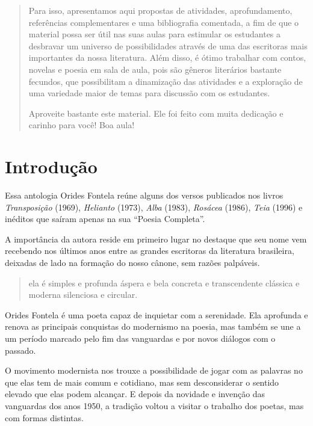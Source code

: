 \documentclass[12pt]{extarticle}
\begin{document}
\begin{abstract}


Para isso, apresentamos aqui propostas de atividades, aprofundamento,
referências complementares e uma bibliografia comentada, a fim de que o
material possa ser útil nas suas aulas para estimular os estudantes a
desbravar um universo de possibilidades através de uma das escritoras
mais importantes da nossa literatura. Além disso, é ótimo trabalhar com
contos, novelas e poesia em sala de aula, pois são gêneros literários
bastante fecundos, que possibilitam a dinamização das atividades e a
exploração de uma variedade maior de temas para discussão com os
estudantes.

Aproveite bastante este material. Ele foi feito com muita dedicação e
carinho para você! Boa aula!
\end{abstract}

\tableofcontents

\section{Introdução} 

Essa antologia Orides Fontela reúne alguns dos versos publicados nos livros
\textit{Transposição} (1969), \textit{Helianto} (1973), \textit{Alba} (1983),
\textit{Rosácea} (1986), \textit{Teia} (1996) e inéditos que saíram apenas na
sua “Poesia Completa”.

A importância da autora reside em primeiro lugar no destaque que seu nome vem
recebendo nos últimos anos entre as grandes escritoras da literatura
brasileira, deixadas de lado na formação do nosso cânone, sem razões palpáveis.

\begin{verse}
ela é simples e profunda
áspera e bela 
concreta e transcendente
clássica e moderna
silenciosa e circular.
\end{verse}

Orides Fontela é uma poeta capaz de inquietar com a serenidade.
Ela aprofunda e renova as principais conquistas do modernismo na poesia, 
mas também se une a um período marcado pelo fim das vanguardas e 
por novos diálogos com o passado.

 

O movimento modernista nos trouxe a possibilidade de jogar com as palavras no
que elas tem de mais comum e cotidiano, mas sem desconsiderar o sentido elevado
que elas podem alcançar.  E depois da novidade e invenção das vanguardas dos
anos 1950, a tradição voltou a visitar o trabalho dos poetas, mas com formas
distintas.
\end{document}
